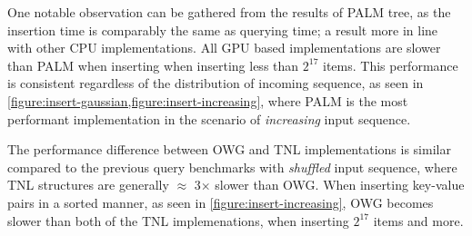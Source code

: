 \clearpage

One notable observation can be gathered from the results of PALM tree, as the insertion time is comparably the same as querying time; a result more in line with other CPU implementations. All GPU based implementations are slower than PALM when inserting when inserting less than $2^{17}$ items. This performance is consistent regardless of the distribution of incoming sequence, as seen in \cref{figure:insert-gaussian,figure:insert-increasing}, where PALM is the most performant implementation in the scenario of \textit{increasing} input sequence.

The performance difference between OWG and TNL implementations is similar compared to the previous query benchmarks with \textit{shuffled} input sequence, where TNL structures are generally $\approx$ 3$\times$ slower than OWG. When inserting key-value pairs in a sorted manner, as seen  in \cref{figure:insert-increasing}, OWG becomes slower than both of the TNL implemenations, when inserting $2^{{17}}$ items and more.
